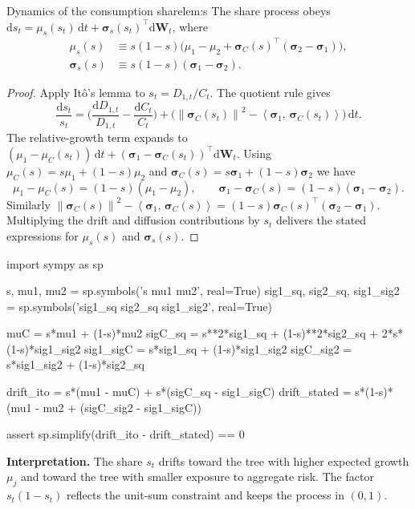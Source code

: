 ﻿\documentclass[11pt,letterpaper,oneside]{article}
\numberwithin{equation}{section}
\newcommand{\1}{\mathbf{1}}
\newcommand{\diff}{\mathrm{d}}
\newcommand{\norm}[1]{\left\lVert #1\right\rVert}
\newcommand{\ip}[2]{\left\langle #1,\,#2\right\rangle}
\begin{document}
\begin{lemma}{Dynamics of the consumption share}{lem:s}
The share process obeys $\diff s_t = \mu_s(s_t)\,\diff t + \bm{\sigma}_s(s_t)^{\top}\diff\bm{W}_t$, where
\begin{align}
  \mu_s(s) &\equiv s(1-s)\Big(\mu_1-\mu_2+\bm{\sigma}_C(s)^{\top}(\bm{\sigma}_2-\bm{\sigma}_1)\Big), \\
  \bm{\sigma}_s(s) &\equiv s(1-s)(\bm{\sigma}_1-\bm{\sigma}_2).
  \label{eq:s_drift}
\end{align}
\end{lemma}
\begin{proof}
Apply It\^o's lemma to $s_t = D_{1,t}/C_t$. The quotient rule gives
\[
  \frac{\diff s_t}{s_t} = \Big(\frac{\diff D_{1,t}}{D_{1,t}}-\frac{\diff C_t}{C_t}\Big) + \Big(\norm{\bm{\sigma}_C(s_t)}^2 - \ip{\bm{\sigma}_1}{\bm{\sigma}_C(s_t)}\Big)\,\diff t.
\]
The relative-growth term expands to $(\mu_1-\mu_C(s_t))\,\diff t + (\bm{\sigma}_1-\bm{\sigma}_C(s_t))^{\top}\diff\bm{W}_t$. Using $\mu_C(s) = s\mu_1 + (1-s)\mu_2$ and $\bm{\sigma}_C(s) = s\bm{\sigma}_1 + (1-s)\bm{\sigma}_2$ we have
\[
  \mu_1-\mu_C(s) = (1-s)(\mu_1-\mu_2),
  \qquad
  \bm{\sigma}_1-\bm{\sigma}_C(s) = (1-s)(\bm{\sigma}_1-\bm{\sigma}_2).
\]
Similarly $\norm{\bm{\sigma}_C(s)}^2 - \ip{\bm{\sigma}_1}{\bm{\sigma}_C(s)} = (1-s)\bm{\sigma}_C(s)^{\top}(\bm{\sigma}_2-\bm{\sigma}_1)$. Multiplying the drift and diffusion contributions by $s_t$ delivers the stated expressions for $\mu_s(s)$ and $\bm{\sigma}_s(s)$.
\end{proof}

\begin{sympycheck}[title={Verification: Share dynamics}]
\begin{pyconsole}
import sympy as sp

s, mu1, mu2 = sp.symbols('s mu1 mu2', real=True)
sig1_sq, sig2_sq, sig1_sig2 = sp.symbols('sig1_sq sig2_sq sig1_sig2', real=True)

muC = s*mu1 + (1-s)*mu2
sigC_sq = s**2*sig1_sq + (1-s)**2*sig2_sq + 2*s*(1-s)*sig1_sig2
sig1_sigC = s*sig1_sq + (1-s)*sig1_sig2
sigC_sig2 = s*sig1_sig2 + (1-s)*sig2_sq

drift_ito = s*(mu1 - muC) + s*(sigC_sq - sig1_sigC)
drift_stated = s*(1-s)*(mu1 - mu2 + (sigC_sig2 - sig1_sigC))

assert sp.simplify(drift_ito - drift_stated) == 0
\end{pyconsole}
\end{sympycheck}

\begin{tcolorbox}[didacticstyle]
\textbf{Interpretation.} The share $s_t$ drifts toward the tree with higher expected growth $\mu_j$ and toward the tree with smaller exposure to aggregate risk. The factor $s_t(1-s_t)$ reflects the unit-sum constraint and keeps the process in $(0,1)$.
\end{tcolorbox}
\end{document}
